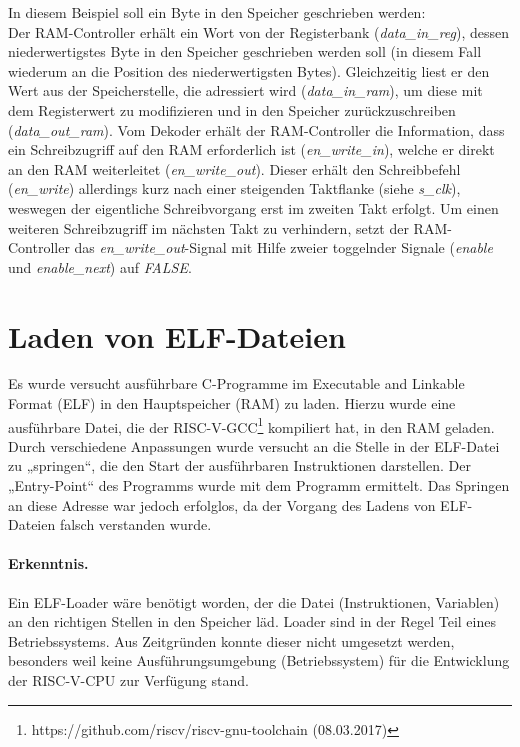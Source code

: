 In diesem Beispiel soll ein Byte in den Speicher geschrieben werden:\\
Der RAM-Controller erhält ein Wort von der Registerbank (\textit{data\_in\_reg}), dessen niederwertigstes Byte in den Speicher geschrieben werden soll (in diesem Fall wiederum an die Position des niederwertigsten Bytes).
Gleichzeitig liest er den Wert aus der Speicherstelle, die adressiert wird  (\textit{data\_in\_ram}), um diese mit dem Registerwert zu modifizieren und in den Speicher zurückzuschreiben (\textit{data\_out\_ram}).
Vom Dekoder erhält der RAM-Controller die Information, dass ein Schreibzugriff auf den RAM erforderlich ist (\textit{en\_write\_in}), welche er direkt an den RAM weiterleitet (\textit{en\_write\_out}).
Dieser erhält den Schreibbefehl (\textit{en\_write}) allerdings kurz nach einer steigenden Taktflanke (siehe \textit{s\_clk}), weswegen der eigentliche Schreibvorgang erst im zweiten Takt erfolgt.
Um einen weiteren Schreibzugriff im nächsten Takt zu verhindern, setzt der RAM-Controller das \textit{en\_write\_out}-Signal  mit Hilfe zweier toggelnder Signale (\textit{enable} und \textit{enable\_next}) auf \textit{FALSE}.
\section{Laden von ELF-Dateien}
Es wurde versucht ausführbare C-Programme im Executable and
Linkable Format (ELF) in den Hauptspeicher (RAM) zu laden. Hierzu wurde
eine ausführbare Datei, die der
RISC-V-GCC\footnote{https://github.com/riscv/riscv-gnu-toolchain
(08.03.2017)} kompiliert hat, in den RAM geladen. Durch verschiedene
Anpassungen wurde versucht an die Stelle in der ELF-Datei zu
„springen“, die den Start der ausführbaren Instruktionen darstellen.
Der „Entry-Point“ des Programms wurde mit dem Programm 
ermittelt. Das Springen an diese Adresse war jedoch erfolglos, da der
Vorgang des Ladens von ELF-Dateien falsch verstanden wurde. 

\paragraph{Erkenntnis.} Ein ELF-Loader wäre benötigt worden, der die Datei (Instruktionen,
Variablen) an den richtigen Stellen in den Speicher läd. Loader sind 
in der Regel Teil eines Betriebssystems. Aus Zeitgründen konnte dieser
nicht umgesetzt werden, besonders weil keine Ausführungsumgebung
(Betriebssystem) für die Entwicklung der RISC-V-CPU zur Verfügung stand.
